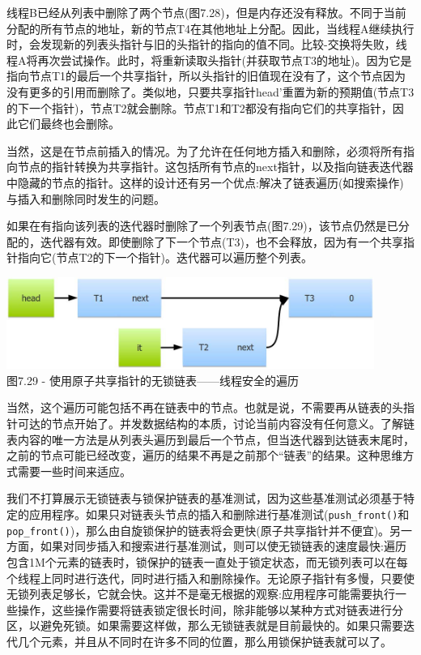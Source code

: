 线程B已经从列表中删除了两个节点(图7.28)，但是内存还没有释放。不同于当前分配的所有节点的地址，新的节点T4在其他地址上分配。因此，当线程A继续执行时，会发现新的列表头指针与旧的头指针的指向的值不同。比较-交换将失败，线程A将再次尝试操作。此时，将重新读取头指针(并获取节点T3的地址)。因为它是指向节点T1的最后一个共享指针，所以头指针的旧值现在没有了，这个节点因为没有更多的引用而删除了。类似地，只要共享指针head'重置为新的预期值(节点T3的下一个指针)，节点T2就会删除。节点T1和T2都没有指向它们的共享指针，因此它们最终也会删除。

当然，这是在节点前插入的情况。为了允许在任何地方插入和删除，必须将所有指向节点的指针转换为共享指针。这包括所有节点的next指针，以及指向链表迭代器中隐藏的节点的指针。这样的设计还有另一个优点:解决了链表遍历(如搜索操作)与插入和删除同时发生的问题。

如果在有指向该列表的迭代器时删除了一个列表节点(图7.29)，该节点仍然是已分配的，迭代器有效。即使删除了下一个节点(T3)，也不会释放，因为有一个共享指针指向它(节点T2的下一个指针)。迭代器可以遍历整个列表。

\begin{center}
\includegraphics[width=0.9\textwidth]{content/2/chapter7/images/29.jpg}\\
图7.29 - 使用原子共享指针的无锁链表——线程安全的遍历
\end{center}

当然，这个遍历可能包括不再在链表中的节点。也就是说，不需要再从链表的头指针可达的节点开始了。并发数据结构的本质，讨论当前内容没有任何意义。了解链表内容的唯一方法是从列表头遍历到最后一个节点，但当迭代器到达链表末尾时，之前的节点可能已经改变，遍历的结果不再是之前那个“链表”的结果。这种思维方式需要一些时间来适应。

我们不打算展示无锁链表与锁保护链表的基准测试，因为这些基准测试必须基于特定的应用程序。如果只对链表头节点的插入和删除进行基准测试(\texttt{push\_front()}和\texttt{pop\_front()})，那么由自旋锁保护的链表将会更快(原子共享指针并不便宜)。另一方面，如果对同步插入和搜索进行基准测试，则可以使无锁链表的速度最快:遍历包含1M个元素的链表时，锁保护的链表一直处于锁定状态，而无锁列表可以在每个线程上同时进行迭代，同时进行插入和删除操作。无论原子指针有多慢，只要使无锁列表足够长，它就会快。这并不是毫无根据的观察:应用程序可能需要执行一些操作，这些操作需要将链表锁定很长时间，除非能够以某种方式对链表进行分区，以避免死锁。如果需要这样做，那么无锁链表就是目前最快的。如果只需要迭代几个元素，并且从不同时在许多不同的位置，那么用锁保护链表就可以了。

